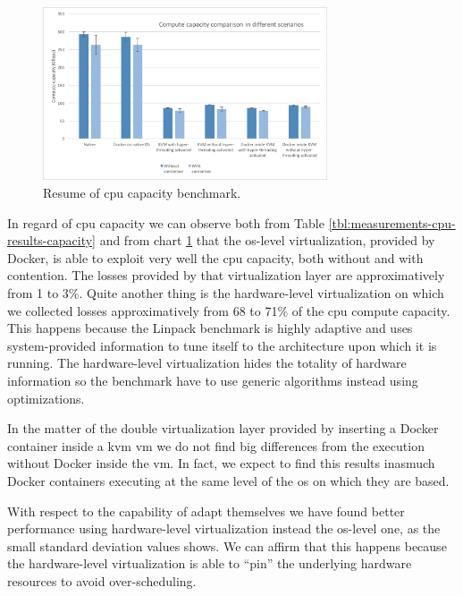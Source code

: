 \begin{figure}
	\centering{}
	\includegraphics[width=0.75\textwidth]{chapters/measurements/images/cpu-capacity.png}
	\caption[Compute - resume of capacity benchmark]{Resume of \acs{cpu} capacity benchmark.}
	\label{img:measurements-cpu-results-capacity}
\end{figure}

In regard of \acs{cpu} capacity we can observe both from Table \ref{tbl:measurements-cpu-results-capacity}
and from chart \ref{img:measurements-cpu-results-capacity} that the \acs{os}-level virtualization,
provided by Docker, is able to exploit very well the \acs{cpu} capacity, both without and with contention.
The losses provided by that virtualization layer are approximatively from 1 to 3\%. Quite another thing is
the  hardware-level virtualization on which we collected losses approximatively from 68 to 71\% of the
\acs{cpu} compute capacity. This happens because the Linpack benchmark is highly adaptive and uses
system-provided information to tune itself to the architecture upon which it is running. The hardware-level
virtualization hides the totality of hardware information so the benchmark have to use generic algorithms
instead using optimizations.

In the matter of the double virtualization layer provided by inserting a Docker container inside a
\ac{kvm} \ac{vm} we do not find big differences from the execution without Docker inside the \ac{vm}.
In fact, we expect to find this results inasmuch Docker containers executing at the same level
of the \acs{os} on which they are based.

With respect to the capability of adapt themselves we have found better performance using
hardware-level virtualization instead the \acs{os}-level one, as the small standard deviation values
shows. We can affirm that this happens because the hardware-level virtualization is able to ``pin''
the underlying hardware resources to avoid over-scheduling.

